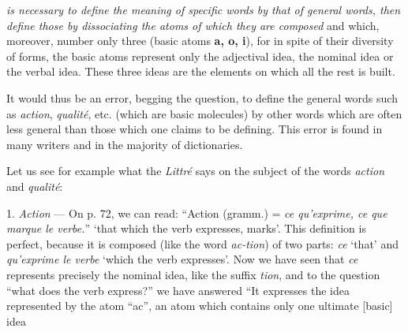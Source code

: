 \begin{sloppypar}
{}
%
{\noindent
  \emph{is necessary to define the meaning of specific words by that
    of general words, then define those by dissociating the atoms of
    which they are composed} and which, moreover, number only three
  (basic atoms \textbf{a, o, i}), for in spite of their diversity of
  forms, the basic atoms represent only the adjectival idea, the
  nominal idea or the verbal idea. These three ideas are the elements
  on which all the rest is built.

  It would thus be an error, begging the question, to define the
  general words such as \emph{action}, \emph{qualité}, etc. (which are basic
  molecules) by other words which are often less general than those
  which one claims to be defining. This error is found in many writers
  and in the majority of dictionaries.

  Let us see for example what the \textsl{Littré} says on the
  subject of the words \emph{action} and \emph{qualité}:

  1. \emph{Action} --- On p. 72, we can read: ``Action (gramm.) =
  \emph{ce qu'exprime, ce que marque le verbe.}'' `that which the verb
  expresses, marks'. This definition is perfect, because it is
  composed (like the word \emph{ac-tion}) of two parts: \emph{ce} `that' and
  \emph{qu'exprime le verbe} `which the verb expresses'.  Now we have
  seen that \emph{ce} represents precisely the nominal idea, like the
  suffix \emph{tion}, and to the question ``what does the verb express?''
  we have answered ``It expresses the idea represented by the atom
  ``ac'', an atom which contains only one ultimate [basic] idea

}

\end{sloppypar}
